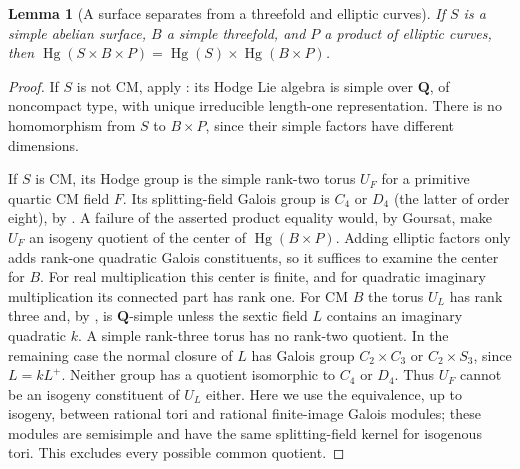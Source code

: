 \documentclass[11pt,reqno]{article}
\theoremstyle{emphasizedplain}
\theoremstyle{emphasizeddefinition}
\theoremstyle{emphasizeddefinition}
\newtheorem{prelemma}{Lemma}
\DeclareMathOperator{\Hg}{Hg}
\newcommand{\Q}{\mathbf Q}
\begin{document}
\begin{prelemma}[A surface separates from a threefold and elliptic curves]
\label{p:surface-three}
If $S$ is a simple abelian surface, $B$ a simple threefold, and $P$ a
product of elliptic curves, then
$\Hg(S\times B\times P)=\Hg(S)\times\Hg(B\times P)$.
\end{prelemma}
\begin{proof}
If $S$ is not CM, apply \cite[Proposition (2.4) and Lemma (3.4)]{MZ}:
its Hodge Lie algebra is simple over $\Q$, of noncompact type, with
unique irreducible length-one representation. There is no homomorphism
from $S$ to $B\times P$, since their simple factors have different dimensions.

If $S$ is CM, its Hodge group is the simple rank-two torus $U_F$ for a
primitive quartic CM field $F$. Its splitting-field Galois group is
$C_4$ or $D_4$ (the latter of order eight), by \cite[\S4]{MZ}.
A failure of the asserted product equality would, by Goursat, make
$U_F$ an isogeny quotient of the center of $\Hg(B\times P)$.
Adding elliptic factors only adds rank-one quadratic Galois constituents,
so it suffices to examine the center for $B$.
For real multiplication this center is finite, and for quadratic
imaginary multiplication its connected part has rank one.
For CM $B$ the torus $U_L$ has rank three and, by
\cite[Proposition (2.4)]{MZ}, is $\Q$-simple unless the sextic field $L$
contains an imaginary quadratic $k$. A simple rank-three torus has no
rank-two quotient. In the remaining case the normal closure of $L$ has
Galois group $C_2\times C_3$ or $C_2\times S_3$, since $L=kL^+$.
Neither group has a quotient isomorphic to $C_4$ or $D_4$.
Thus $U_F$ cannot be an isogeny constituent of $U_L$ either.
Here we use the equivalence, up to isogeny, between rational tori and
rational finite-image Galois modules; these modules are semisimple and
have the same splitting-field kernel for isogenous tori.
This excludes every possible common quotient.
\end{proof}
\end{document}
